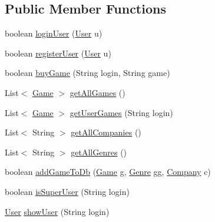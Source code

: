 \subsection*{Public Member Functions}
\begin{DoxyCompactItemize}
\item 
boolean \hyperlink{interfacees_1_1deusto_1_1server_1_1db_1_1_i_d_b_a6e6196e5899fc93134223373ed8363a6}{login\+User} (\hyperlink{classes_1_1deusto_1_1server_1_1db_1_1data_1_1_user}{User} u)
\item 
boolean \hyperlink{interfacees_1_1deusto_1_1server_1_1db_1_1_i_d_b_ad9ecf628cb97ade7cb1b10fd1b3a18c4}{register\+User} (\hyperlink{classes_1_1deusto_1_1server_1_1db_1_1data_1_1_user}{User} u)
\item 
boolean \hyperlink{interfacees_1_1deusto_1_1server_1_1db_1_1_i_d_b_ab1076d02bd6b4da29d0e99e1310048b6}{buy\+Game} (String login, String game)
\item 
List$<$ \hyperlink{classes_1_1deusto_1_1server_1_1db_1_1data_1_1_game}{Game} $>$ \hyperlink{interfacees_1_1deusto_1_1server_1_1db_1_1_i_d_b_a76af81d4bb71c81490da92d67c5b6d03}{get\+All\+Games} ()
\item 
List$<$ \hyperlink{classes_1_1deusto_1_1server_1_1db_1_1data_1_1_game}{Game} $>$ \hyperlink{interfacees_1_1deusto_1_1server_1_1db_1_1_i_d_b_ac5ef9780a640140576f9373f8b57631c}{get\+User\+Games} (String login)
\item 
List$<$ String $>$ \hyperlink{interfacees_1_1deusto_1_1server_1_1db_1_1_i_d_b_af7500b1f7c74d658837ed1a5ec82ebec}{get\+All\+Companies} ()
\item 
List$<$ String $>$ \hyperlink{interfacees_1_1deusto_1_1server_1_1db_1_1_i_d_b_ab0d82284b373b0ea3e0c441892e678b5}{get\+All\+Genres} ()
\item 
boolean \hyperlink{interfacees_1_1deusto_1_1server_1_1db_1_1_i_d_b_a645335b2cbfa27c0199783ff2f33559e}{add\+Game\+To\+Db} (\hyperlink{classes_1_1deusto_1_1server_1_1db_1_1data_1_1_game}{Game} g, \hyperlink{classes_1_1deusto_1_1server_1_1db_1_1data_1_1_genre}{Genre} gg, \hyperlink{classes_1_1deusto_1_1server_1_1db_1_1data_1_1_company}{Company} c)
\item 
boolean \hyperlink{interfacees_1_1deusto_1_1server_1_1db_1_1_i_d_b_a279d8a59498d4157f2d20ce7f0c4cfdb}{is\+Super\+User} (String login)
\item 
\hyperlink{classes_1_1deusto_1_1server_1_1db_1_1data_1_1_user}{User} \hyperlink{interfacees_1_1deusto_1_1server_1_1db_1_1_i_d_b_aa2f6a5291fa8aa78d5a73b5878d17986}{show\+User} (String login)

\end{DoxyCompactItemize}
